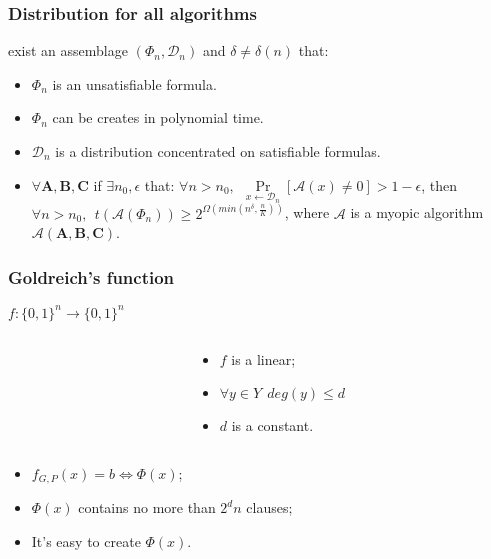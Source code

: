 \begin{frame}
    \frametitle{Distribution for all algorithms}

    \begin{theorem}
        exist an assemblage $(\Phi_n, \mathcal{D}_n)$ and $\delta \ne
        \delta(n)$ that:
        \pause
        \begin{itemize}
            \item $\Phi_n$ is an unsatisfiable formula.
        	\item $\Phi_n$ can be creates in polynomial time.
        	\pause
            \item $\mathcal{D}_n$ is a distribution concentrated on
		        satisfiable formulas.
            \pause
            \item $\forall \mathbf{A}, \mathbf{B}, \mathbf{C}$ 
		        if $\exists n_0, \epsilon$ that:
				$\forall n > n_0, ~~ \Pr\limits_{x \gets \mathcal{D}_n}[\mathcal{A}(x)
                \ne 0] > 1 - \epsilon$, then
                $\forall n > n_0, ~~ t(\mathcal{A}(\Phi_n)) \ge 2^{\Omega(min(n^\delta,
                \frac{n}{K}))}$, where $\mathcal{A}$ is a myopic algorithm
			    $\mathcal{A}(\mathbf{A}, \mathbf{B},\mathbf{C})$.
        \end{itemize}
    \end{theorem}
\end{frame}

\begin{frame}
	\frametitle{Goldreich's function}
	$f:\{0, 1\}^n \rightarrow \{0, 1\}^n$

    \pause

    \begin{columns}
    	\begin{column}{5.5cm}
            
        \end{column}

        \pause
        \pause
        \begin{column}{5.5cm}
            \begin{itemize}
	            \item $f$ is a linear;
            	\pause
                \item $\forall y \in Y ~~ deg(y) \le d$
            	\pause
            	\item $d$ is a constant.
            \end{itemize}
        \end{column}
	\end{columns}
    
	\pause
    \begin{itemize}
	    \item $f_{G, P}(x) = b \Leftrightarrow \Phi(x)$;
    	\pause
	    \item $\Phi(x)$ contains no more than $2^dn$ clauses;
    	\pause
    	\item It's easy to create $\Phi(x)$.
    \end{itemize}
\end{frame}

